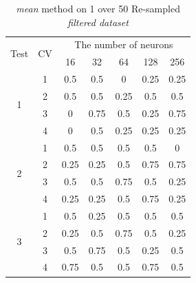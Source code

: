\documentclass[draft,dvipsnames]{drexel-thesis}
\begin{document}
\begin{thesis}
\begin{table}[!t]
\centering
\caption{{\em mean} method on 1 over 50 Re-sampled {\em filtered dataset}}
\label{tbl:mean_1_50}
\begin{tabular}{|c|c|c|c|c|c|c|}
\hline
\multirow{2}{*}{Test} & \multirow{2}{*}{CV} & \multicolumn{5}{c|}{The number of neurons}                             \\ \cline{3-7}
                      &                     & 16          & 32           & 64          & 128          & 256          \\ \hline
\multirow{4}{*}{1}    & 1                   & 0.5         & 0.5          & 0           & 0.25         & 0.25         \\ \cline{2-7}
                      & 2                   & 0.5         & 0.5          & 0.25        & 0.5          & 0.5          \\ \cline{2-7}
                      & 3                   & 0           & 0.75         & 0.5         & 0.25         & 0.75         \\ \cline{2-7}
                      & 4                   & 0           & 0.5          & 0.25        & 0.25         & 0.25         \\ \hline
\multirow{4}{*}{2}    & 1                   & 0.5         & 0.5          & 0.5         & 0.5          & 0            \\ \cline{2-7}
                      & 2                   & 0.25        & 0.25         & 0.5         & 0.75         & 0.75         \\ \cline{2-7}
                      & 3                   & 0.5         & 0.5          & 0.75        & 0.5          & 0.25         \\ \cline{2-7}
                      & 4                   & 0.25        & 0.25         & 0.5         & 0.75         & 0.25         \\ \hline
\multirow{4}{*}{3}    & 1                   & 0.5         & 0.25         & 0.5         & 0.5          & 0.5          \\ \cline{2-7}
                      & 2                   & 0.25        & 0.5          & 0.75        & 0.5          & 0.25         \\ \cline{2-7}
                      & 3                   & 0.5         & 0.75         & 0.5         & 0.25         & 0.5          \\ \cline{2-7}
                      & 4                   & 0.75        & 0.5          & 0.5         & 0.75         & 0.5          \\ \hline

\end{tabular}
\end{table}
\end{thesis}
\end{document}
